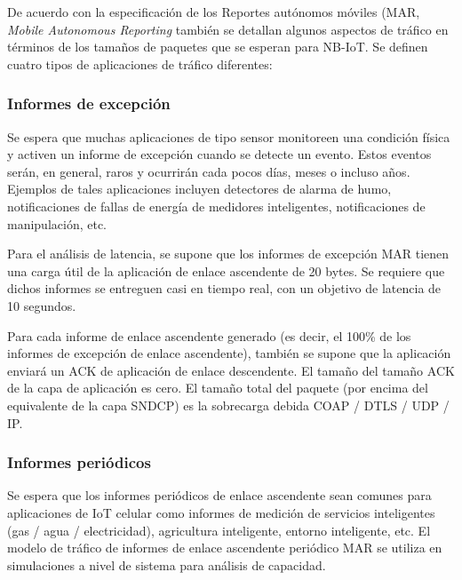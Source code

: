 De acuerdo con la especificación de los Reportes autónomos móviles (MAR, \textit{Mobile Autonomous Reporting} también se detallan algunos aspectos de tráfico en términos de los tamaños de paquetes que se esperan para NB-IoT. Se definen cuatro tipos de aplicaciones de tráfico diferentes:

\subsubsection{Informes de excepción}

Se espera que muchas aplicaciones de tipo sensor monitoreen una condición física y activen un informe de excepción cuando se detecte un evento. Estos eventos serán, en general, raros y ocurrirán cada pocos días, meses o incluso años. Ejemplos de tales aplicaciones incluyen detectores de alarma de humo, notificaciones de fallas de energía de medidores inteligentes, notificaciones de manipulación, etc.\newline

Para el análisis de latencia, se supone que los informes de excepción MAR tienen una carga útil de la aplicación de enlace ascendente de 20 bytes. Se requiere que dichos informes se entreguen casi en tiempo real, con un objetivo de latencia de 10 segundos.\newline

Para cada informe de enlace ascendente generado (es decir, el 100\% de los informes de excepción de enlace ascendente), también se supone que la aplicación enviará un ACK de aplicación de enlace descendente. El tamaño del tamaño ACK de la capa de aplicación es cero. El tamaño total del paquete (por encima del equivalente de la capa SNDCP) es la sobrecarga debida COAP / DTLS / UDP / IP.\newline

\subsubsection{Informes periódicos}\label{Informesperiodicos}

Se espera que los informes periódicos de enlace ascendente sean comunes para aplicaciones de IoT celular como informes de medición de servicios inteligentes (gas / agua / electricidad), agricultura inteligente, entorno inteligente, etc. El modelo de tráfico de informes de enlace ascendente periódico MAR se utiliza en simulaciones a nivel de sistema para análisis de capacidad.\newline

